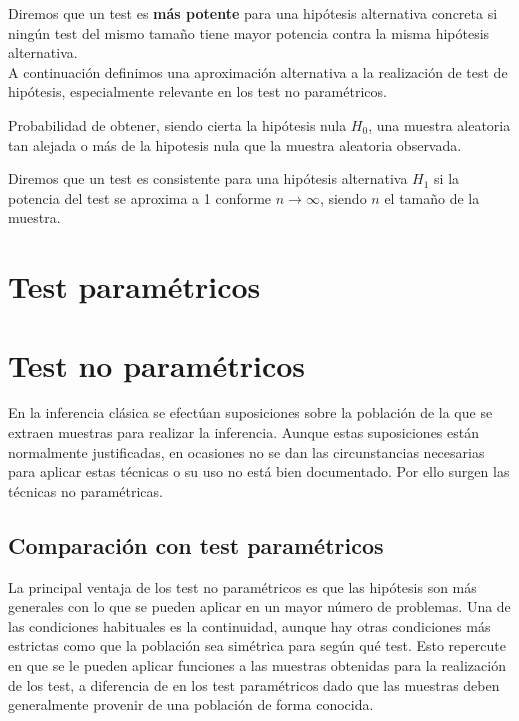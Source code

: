 	Diremos que un test es \textbf{más potente} para una hipótesis alternativa concreta si ningún test del mismo tamaño tiene mayor potencia contra la misma hipótesis alternativa.\\
	A continuación definimos una aproximación alternativa a la realización de test de hipótesis, especialmente relevante en los test no paramétricos. 
	
\begin{definicion}[$p$-valor]
	Probabilidad de obtener, siendo cierta la hipótesis nula $H_0$, una muestra aleatoria tan alejada o más de la hipotesis nula que la muestra aleatoria observada.
\end{definicion}

\begin{definicion}[Consistencia]
	Diremos que un test es consistente para una hipótesis alternativa $H_1$ si la potencia del test se aproxima a 1 conforme $n \rightarrow \infty$, siendo $n$ el tamaño de la muestra.
\end{definicion}
	
	
\section{Test paramétricos}

\section{Test no paramétricos}

	En la inferencia clásica se efectúan suposiciones sobre la población de la que se extraen muestras para realizar la inferencia. Aunque estas suposiciones están normalmente justificadas, en ocasiones no se dan las circunstancias necesarias para aplicar estas técnicas o su uso no está bien documentado. Por ello surgen las técnicas no paramétricas.
	
	\subsection*{Comparación con test paramétricos}
	
 	La principal ventaja de los test no paramétricos es que las hipótesis son más generales con lo que se pueden aplicar en un mayor número de problemas. Una de las condiciones habituales es la continuidad, aunque hay otras condiciones más estrictas como que la población sea simétrica para según qué test. Esto repercute en que se le pueden aplicar funciones a las muestras obtenidas para la realización de los test, a diferencia de en los test paramétricos dado que las muestras deben generalmente provenir de una población de forma conocida.\\
 	
